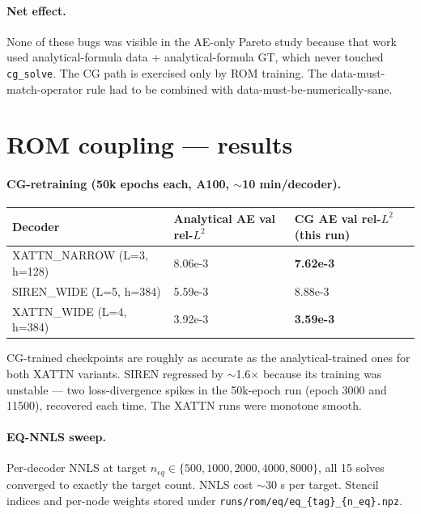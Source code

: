 \documentclass[11pt]{article}
\begin{document}
\paragraph{Net effect.}
None of these bugs was visible in the AE-only Pareto study because
that work used analytical-formula data + analytical-formula GT, which
never touched \texttt{cg\_solve}. The CG path is exercised only by ROM
training. The data-must-match-operator rule had to be combined with
data-must-be-numerically-sane.

\section{ROM coupling --- results}

\paragraph{CG-retraining (50k epochs each, A100, $\sim$10 min/decoder).}
\begin{center}
\begin{tabular}{lll}
\toprule
Decoder & Analytical AE val rel-$L^2$ & CG AE val rel-$L^2$ (this run) \\
\midrule
XATTN\_NARROW (L=3, h=128) & 8.06e-3 & \textbf{7.62e-3} \\
SIREN\_WIDE  (L=5, h=384)  & 5.59e-3 & 8.88e-3 \\
XATTN\_WIDE  (L=4, h=384)  & 3.92e-3 & \textbf{3.59e-3} \\
\bottomrule
\end{tabular}
\end{center}

CG-trained checkpoints are roughly as accurate as the analytical-trained
ones for both XATTN variants. SIREN regressed by $\sim$1.6$\times$
because its training was unstable --- two loss-divergence spikes in the
50k-epoch run (epoch 3000 and 11500), recovered each time. The XATTN
runs were monotone smooth.

\paragraph{EQ-NNLS sweep.}
Per-decoder NNLS at target $n_{eq} \in \{500, 1000, 2000, 4000, 8000\}$,
all 15 solves converged to exactly the target count. NNLS cost $\sim$30 s
per target. Stencil indices and per-node weights stored under
\texttt{runs/rom/eq/eq\_\{tag\}\_\{n\_eq\}.npz}.
\end{document}
